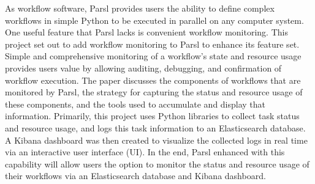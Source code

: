 As workflow software, Parsl provides users the ability to define complex workflows in simple Python to be executed in parallel on any computer system.
One useful feature that Parsl lacks is convenient workflow monitoring.
This project set out to add workflow monitoring to Parsl to enhance its feature set.
Simple and comprehensive monitoring of a workflow's state and resource usage provides users value by allowing auditing, debugging, and confirmation of workflow execution.
The paper discusses the components of workflows that are monitored by Parsl, the strategy for capturing the status and resource usage of these components, and the tools used to accumulate and display that information.
Primarily, this project uses Python libraries to collect task status and resource usage, and logs this task information to an Elasticsearch database.
A Kibana dashboard was then created to visualize the collected logs in real time via an interactive user interface (UI).
In the end, Parsl enhanced with this capability will allow users the option to monitor the status and resource usage of their workflows via an Elasticsearch database and Kibana dashboard.
